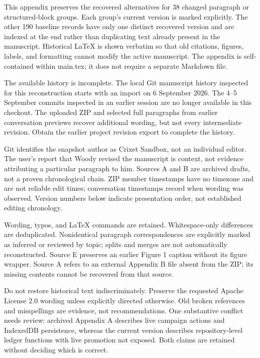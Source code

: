 \documentclass[11pt]{article}
\begin{document}
This appendix preserves the recovered alternatives for 38 changed paragraph or structured-block groups. Each group's current version is marked explicitly. The other 190 baseline records have only one distinct recovered version and are indexed at the end rather than duplicating text already present in the manuscript. Historical LaTeX is shown verbatim so that old citations, figures, labels, and formatting cannot modify the active manuscript. The appendix is self-contained within main.tex; it does not require a separate Markdown file.

The available history is incomplete. The local Git manuscript history inspected for this reconstruction starts with an import on 6 September 2026. The 4--5 September commits inspected in an earlier session are no longer available in this checkout. The uploaded ZIP and selected full paragraphs from earlier conversation previews recover additional wording, but not every intermediate revision. Obtain the earlier project revision export to complete the history.

Git identifies the snapshot author as Crixet Sandbox, not an individual editor. The user's report that Woody revised the manuscript is context, not evidence attributing a particular paragraph to him. Sources A and B are archived drafts, not a proven chronological chain. ZIP member timestamps have no timezone and are not reliable edit times; conversation timestamps record when wording was observed. Version numbers below indicate presentation order, not established editing chronology.

Wording, typos, and LaTeX commands are retained. Whitespace-only differences are deduplicated. Nonidentical paragraph correspondences are explicitly marked as inferred or reviewed by topic; splits and merges are not automatically reconstructed. Source E preserves an earlier Figure 1 caption without its figure wrapper. Source A refers to an external Appendix B file absent from the ZIP; its missing contents cannot be recovered from that source.

Do not restore historical text indiscriminately. Preserve the requested Apache License 2.0 wording unless explicitly directed otherwise. Old broken references and misspellings are evidence, not recommendations. One substantive conflict needs review: archived Appendix A describes live campaign actions and IndexedDB persistence, whereas the current version describes repository-level ledger functions with live promotion not exposed. Both claims are retained without deciding which is correct.
\end{document}
